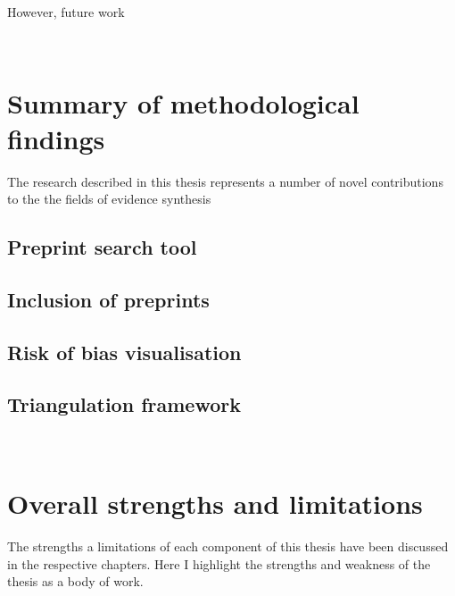 \documentclass[a4paper, twoside]{templates/ociamthesis}
\begin{document}
However, future work

~

\newpage

\hypertarget{summary-of-methodological-findings}{%
\section{Summary of methodological findings}\label{summary-of-methodological-findings}}

The research described in this thesis represents a number of novel contributions to the the fields of evidence synthesis

\hypertarget{preprint-search-tool}{%
\subsection{Preprint search tool}\label{preprint-search-tool}}

\newpage

\hypertarget{inclusion-of-preprints-1}{%
\subsection{Inclusion of preprints}\label{inclusion-of-preprints-1}}

\newpage

\hypertarget{risk-of-bias-visualisation}{%
\subsection{Risk of bias visualisation}\label{risk-of-bias-visualisation}}

\newpage

\hypertarget{triangulation-framework}{%
\subsection{Triangulation framework}\label{triangulation-framework}}

~

\newpage

\hypertarget{overall-strengths-and-limitations}{%
\section{Overall strengths and limitations}\label{overall-strengths-and-limitations}}

The strengths a limitations of each component of this thesis have been discussed in the respective chapters. Here I highlight the strengths and weakness of the thesis as a body of work.
\end{document}
